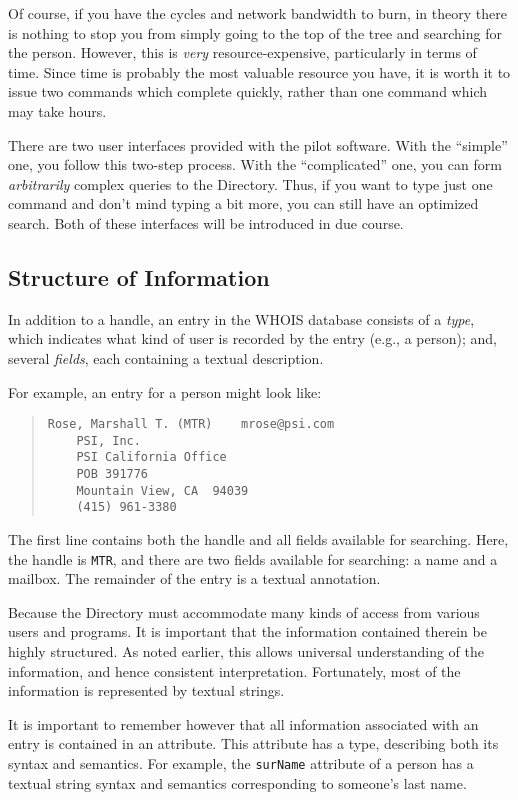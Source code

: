 Of course,
if you have the cycles and network bandwidth to burn,
in theory there is nothing to stop you from simply going to the top of the
tree and searching for the person.
However,
this is {\em very\/} resource-expensive,
particularly in terms of time.
Since time is probably the most valuable resource you have,
it is worth it to issue two commands which complete quickly,
rather than one command which may take hours.

There are  two user interfaces provided with the pilot software.
With the ``simple'' one,
you follow this two-step process.
With the ``complicated'' one,
you can form {\em arbitrarily\/} complex queries to the Directory.
Thus,
if you  want to type just one command and don't mind typing a bit more,
you can still have an optimized search.
Both of these interfaces will be introduced in due course.

\subsection	{Structure of Information}
In addition to a handle,
an entry in the WHOIS database consists of a {\em type},
which indicates what kind of user is recorded by the entry
(e.g., a person);
and,
several {\em fields}, each containing a textual description.

For example,
an entry for a person might look like:
\begin{quote}\small\begin{verbatim}
Rose, Marshall T. (MTR)    mrose@psi.com
    PSI, Inc.
    PSI California Office
    POB 391776
    Mountain View, CA  94039
    (415) 961-3380
\end{verbatim}\end{quote}
The first line contains both the handle and all fields available for searching.
Here,
the handle is \verb"MTR",
and there are two fields available for searching:
a name and a mailbox.
The remainder of the entry is a textual annotation.

Because the Directory must accommodate many kinds of access from various users
and programs.
It is important that the information contained therein be highly structured.
As noted earlier,
this allows universal understanding of the information,
and hence consistent interpretation.
Fortunately,
most of the information is represented by textual strings.

It is important to remember however that all information associated with an
entry is contained in an attribute.
This attribute has a type,
describing both its syntax and semantics.
For example,
the \verb"surName" attribute of a person has a textual string syntax and
semantics corresponding to someone's last name.

